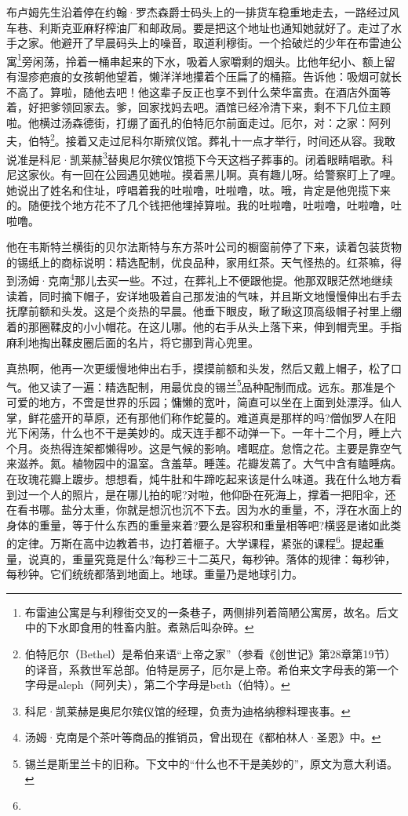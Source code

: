 \par 布卢姆先生沿着停在约翰·罗杰森爵士码头上的一排货车稳重地走去，一路经过风车巷、利斯克亚麻籽榨油厂和邮政局。要是把这个地址也通知她就好了。走过了水手之家。他避开了早晨码头上的噪音，取道利穆街。一个拾破烂的少年在布雷迪公寓\footnote{布雷迪公寓是与利穆街交叉的一条巷子，两侧排列着简陋公寓房，故名。后文中的下水即食用的牲畜内脏。煮熟后叫杂碎。}旁闲荡，拎着一桶串起来的下水，吸着人家嚼剩的烟头。比他年纪小、额上留有湿疹疤痕的女孩朝他望着，懒洋洋地攥着个压扁了的桶箍。告诉他：吸烟可就长不高了。算啦，随他去吧！他这辈子反正也享不到什么荣华富贵。在酒店外面等着，好把爹领回家去。爹，回家找妈去吧。酒馆已经冷清下来，剩不下几位主顾啦。他横过汤森德街，打绷了面孔的伯特厄尔前面走过。厄尔，对：之家：阿列夫，伯特\footnote{伯特厄尔（Bethel）是希伯来语“上帝之家”（参看《创世记》第28章第19节）的译音，系救世军总部。伯特是房子，厄尔是上帝。希伯来文字母表的第一个字母是aleph（阿列夫），第二个字母是beth（伯特）。}。接着又走过尼科尔斯殡仪馆。葬礼十一点才举行，时间还从容。我敢说准是科尼·凯莱赫\footnote{科尼·凯莱赫是奥尼尔殡仪馆的经理，负责为迪格纳穆料理丧事。}替奥尼尔殡仪馆揽下今天这档子葬事的。闭着眼睛唱歌。科尼这家伙。有一回在公园遇见她啦。摸着黑儿啊。真有趣儿呀。给警察盯上了哩。她说出了姓名和住址，哼唱着我的吐啦噜，吐啦噜，呔。哦，肯定是他兜揽下来的。随便找个地方花不了几个钱把他埋掉算啦。我的吐啦噜，吐啦噜，吐啦噜，吐啦噜。
\par 他在韦斯特兰横街的贝尔法斯特与东方茶叶公司的橱窗前停了下来，读着包装货物的锡纸上的商标说明：精选配制，优良品种，家用红茶。天气怪热的。红茶嘛，得到汤姆·克南\footnote{汤姆·克南是个茶叶等商品的推销员，曾出现在《都柏林人·圣恩》中。}那儿去买一些。不过，在葬礼上不便跟他提。他那双眼茫然地继续读着，同时摘下帽子，安详地吸着自己那发油的气味，并且斯文地慢慢伸出右手去抚摩前额和头发。这是个炎热的早晨。他垂下眼皮，瞅了瞅这顶高级帽子衬里上绷着的那圈鞣皮的小小帽花。在这儿哪。他的右手从头上落下来，伸到帽壳里。手指麻利地掏出鞣皮圈后面的名片，将它挪到背心兜里。
\par 真热啊，他再一次更缓慢地伸出右手，摸摸前额和头发，然后又戴上帽子，松了口气。他又读了一遍：精选配制，用最优良的锡兰\footnote{锡兰是斯里兰卡的旧称。下文中的“什么也不干是美妙的”，原文为意大利语。}品种配制而成。远东。那准是个可爱的地方，不啻是世界的乐园；慵懒的宽叶，简直可以坐在上面到处漂浮。仙人掌，鲜花盛开的草原，还有那他们称作蛇蔓的。难道真是那样的吗?僧伽罗人在阳光下闲荡，什么也不干是美妙的。成天连手都不动弹一下。一年十二个月，睡上六个月。炎热得连架都懒得吵。这是气候的影响。嗜眠症。怠惰之花。主要是靠空气来滋养。氮。植物园中的温室。含羞草。睡莲。花瓣发蔫了。大气中含有瞌睡病。在玫瑰花瓣上踱步。想想看，炖牛肚和牛蹄吃起来该是什么味道。我在什么地方看到过一个人的照片，是在哪儿拍的呢?对啦，他仰卧在死海上，撑着一把阳伞，还在看书哪。盐分太重，你就是想沉也沉不下去。因为水的重量，不，浮在水面上的身体的重量，等于什么东西的重量来着?要么是容积和重量相等吧?横竖是诸如此类的定律。万斯在高中边教着书，边打着榧子。大学课程，紧张的课程\footnote{}。提起重量，说真的，重量究竟是什么?每秒三十二英尺，每秒钟。落体的规律：每秒钟，每秒钟。它们统统都落到地面上。地球。重量乃是地球引力。
